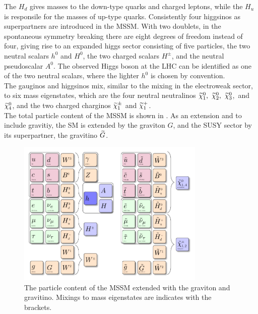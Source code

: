 The $H_d$ gives masses to the down-type quarks and charged leptons, while the $H_u$ is responsile for the masses of up-type quarks. Consistently four higgsinos as superpartners are introduced in the MSSM. With two doublets, in the spontaneous symmetry breaking there are eight degrees of freedom instead of four, giving rise to an expanded higgs sector consisting of five particles, the two neutral scalars $h^0$ and $H^0$, the two charged scalars $H^{\pm}$, and the neutral pseudoscalar $A^0$. The observed Higgs boson at the LHC can be identified as one of the two neutral scalars, where the lighter $h^0$ is chosen by convention.\\
The gauginos and higgsinos mix, similar to the mixing in the electroweak sector, to six mass eigenstates, which are the four neutral neutralinos $\widetilde{\chi}^{0}_{1},~\widetilde{\chi}^{0}_{2},~\widetilde{\chi}^{0}_{3}$,~and $\widetilde{\chi}^{0}_{4}$, and the two charged charginos $\widetilde{\chi}^\pm_{1}$ and $\widetilde{\chi}^{+}_{1}$.\\
The total particle content of the MSSM is shown in . As an extension and to include gravitiy, the SM is extended by the graviton $G$, and the SUSY sector by its superpartner, the gravitino $\widetilde{G}$.

\begin{figure}[!htpb]
\centering
  \includegraphics[width=0.8\textwidth]{figures/general/MSSM}
  \caption{The particle content of the MSSM extended with the graviton and gravitino. Mixings to mass eigenstates are indicates with the brackets.}
  \label{fig:mssm}
\end{figure}

